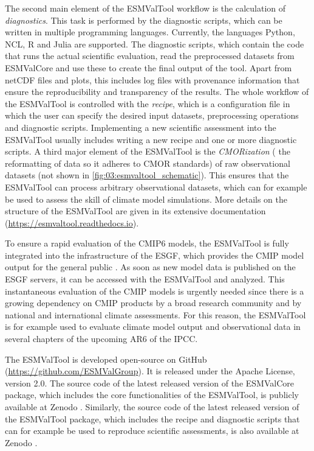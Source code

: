 The second main element of the \ac{ESMValTool} workflow is the calculation of
\emph{diagnostics}. This task is performed by the diagnostic scripts, which can
be written in multiple programming languages. Currently, the languages Python,
NCL, R and Julia are supported. The diagnostic scripts, which contain the code
that runs the actual scientific evaluation, read the preprocessed datasets from
\ac{ESMValCore} and use these to create the final output of the tool. Apart
from \ac{netCDF} files and plots, this includes log files with provenance
information that ensure the reproducibility and transparency of the results.
The whole workflow of the \ac{ESMValTool} is controlled with the \emph{recipe},
which is a configuration file in which the user can specify the desired input
datasets, preprocessing operations and diagnostic scripts. Implementing a new
scientific assessment into the \ac{ESMValTool} usually includes writing a new
recipe and one or more diagnostic scripts. A third major element of the
\ac{ESMValTool} is the \emph{\ac{CMOR}ization} (\ie{} the reformatting of data
so it adheres to \ac{CMOR} standards) of raw observational datasets (not shown
in \cref{fig:03:esmvaltool_schematic}). This ensures that the \ac{ESMValTool}
can process arbitrary observational datasets, which can for example be used to
assess the skill of climate model simulations. More details on the structure of
the \ac{ESMValTool} are given in its extensive documentation
(\url{https://esmvaltool.readthedocs.io}).

To ensure a rapid evaluation of the \acs{CMIP}6 models, the \ac{ESMValTool} is
fully integrated into the infrastructure of the \ac{ESGF}, which provides the
\ac{CMIP} model output for the general public \autocite{Eyring2016b}. As soon
as new model data is published on the \ac{ESGF} servers, it can be accessed
with the \ac{ESMValTool} and analyzed. This instantaneous evaluation of the
\ac{CMIP} models is urgently needed since there is a growing dependency on
\ac{CMIP} products by a broad research community and by national and
international climate assessments. For this reason, the \ac{ESMValTool} is for
example used to evaluate climate model output and observational data in several
chapters of the upcoming \ac{AR6} of the \ac{IPCC}.

The \ac{ESMValTool} is developed open-source on GitHub
(\url{https://github.com/ESMValGroup}). It is released under the Apache
License, version 2.0. The source code of the latest released version of the
\ac{ESMValCore} package, which includes the core functionalities of the
\ac{ESMValTool}, is publicly available at Zenodo \autocite{Andela2020a}.
Similarly, the source code of the latest released version of the
\ac{ESMValTool} package, which includes the recipe and diagnostic scripts that
can for example be used to reproduce scientific assessments, is also available
at Zenodo \autocite{Andela2020}.


